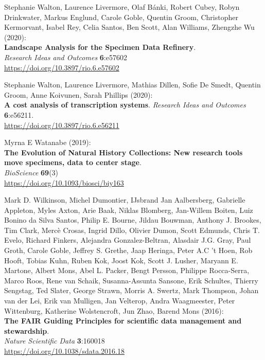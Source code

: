 \begin{thebibliography}{9}
Stephanie Walton, Laurence Livermore, Olaf Bánki,
Robert Cubey, Robyn Drinkwater, Markus Englund, Carole Goble, Quentin
Groom, Christopher Kermorvant, Isabel Rey, Celia Santos, Ben Scott, Alan
Williams, Zhengzhe Wu (2020):\\
\textbf{Landscape Analysis for the Specimen Data Refinery}.\\
\emph{Research Ideas and Outcomes} \textbf{6}:e57602\\
\url{https://doi.org/10.3897/rio.6.e57602}

Stephanie Walton, Laurence Livermore, Mathias Dillen, Sofie De Smedt, Quentin Groom, Anne Koivunen, Sarah Phillips (2020):\\
\textbf{A cost analysis of transcription systems}. 
\emph{Research Ideas and Outcomes} \textbf{6}:e56211.\\
\url{https://doi.org/10.3897/rio.6.e56211}

Myrna E Watanabe (2019):\\
\textbf{The Evolution of Natural History Collections:
New research tools move specimens, data to center stage}.\\
\emph{BioScience} \textbf{69}(3)\\
\url{https://doi.org/10.1093/biosci/biy163}

Mark D. Wilkinson, Michel Dumontier, IJsbrand Jan
Aalbersberg, Gabrielle Appleton, Myles Axton, Arie Baak, Niklas
Blomberg, Jan-Willem Boiten, Luiz Bonino da Silva Santos, Philip E.
Bourne, Jildau Bouwman, Anthony J. Brookes, Tim Clark, Mercè Crosas,
Ingrid Dillo, Olivier Dumon, Scott Edmunds, Chris T. Evelo, Richard
Finkers, Alejandra Gonzalez-Beltran, Alasdair J.G. Gray, Paul Groth,
Carole Goble, Jeffrey S. Grethe, Jaap Heringa, Peter A.C 't Hoen, Rob
Hooft, Tobias Kuhn, Ruben Kok, Joost Kok, Scott J. Lusher, Maryann E.
Martone, Albert Mons, Abel L. Packer, Bengt Persson, Philippe
Rocca-Serra, Marco Roos, Rene van Schaik, Susanna-Assunta Sansone, Erik
Schultes, Thierry Sengstag, Ted Slater, George Strawn, Morris A. Swertz,
Mark Thompson, Johan van der Lei, Erik van Mulligen, Jan Velterop, Andra
Waagmeester, Peter Wittenburg, Katherine Wolstencroft, Jun Zhao, Barend
Mons (2016):\\
\textbf{The FAIR Guiding Principles for scientific data management and
stewardship}.\\
\emph{Nature Scientific Data} \textbf{3}:160018\\
\url{https://doi.org/10.1038/sdata.2016.18}



\end{thebibliography}

